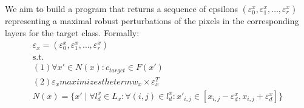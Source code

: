 We aim to build a program that returns a sequence of epsilons $(\varepsilon_0^x, \varepsilon_1^x, \ldots, \varepsilon_r^x)$ representing a maximal robust perturbations of the pixels in the corresponding layers for the target class.
Formally:
\begin{gather*}
    \varepsilon_x = (\varepsilon_0^x, \varepsilon_1^x, \ldots, \varepsilon_r^x)\\
    \textrm{s.t.}\\
    (1)  \forall x' \in N(x): c_{target} \in F(x')\\
    (2)  \varepsilon_x  maximizes the term  w_x \times \varepsilon_x^T\\
    N(x) = \{x' \mid \forall l_d^x\in L_x: \forall (i,j)\in l_d^x: x'_{i,j} \in [x_{i,j}-\varepsilon_d^x, x_{i,j}+\varepsilon_d^x]\}\\
\end{gather*}
